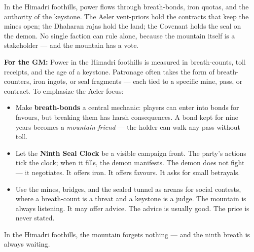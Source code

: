 \begin{tcolorbox}[colback=black!3,colframe=black!40!white,title={Patronage \& Power}]
In the Himadri foothills, power flows through breath-bonds, iron quotas, and the authority of the keystone. The Aeler vent-priors hold the contracts that keep the mines open; the Dhaharan rajas hold the land; the Covenant holds the seal on the demon. No single faction can rule alone, because the mountain itself is a stakeholder — and the mountain has a vote.

\textbf{For the GM:}  
Power in the Himadri foothills is measured in breath-counts, toll receipts, and the age of a keystone. Patronage often takes the form of breath-counters, iron ingots, or seal fragments — each tied to a specific mine, pass, or contract. To emphasize the Aeler focus:
\begin{itemize}
\item Make \textbf{breath-bonds} a central mechanic: players can enter into bonds for favours, but breaking them has harsh consequences. A bond kept for nine years becomes a \textit{mountain-friend} — the holder can walk any pass without toll.
\item Let the \textbf{Ninth Seal Clock} be a visible campaign front. The party's actions tick the clock; when it fills, the demon manifests. The demon does not fight — it negotiates. It offers iron. It offers favours. It asks for small betrayals.
\item Use the mines, bridges, and the sealed tunnel as arenas for social contests, where a breath-count is a threat and a keystone is a judge. The mountain is always listening. It may offer advice. The advice is usually good. The price is never stated.
\end{itemize}
In the Himadri foothills, the mountain forgets nothing — and the ninth breath is always waiting.
\end{tcolorbox}

